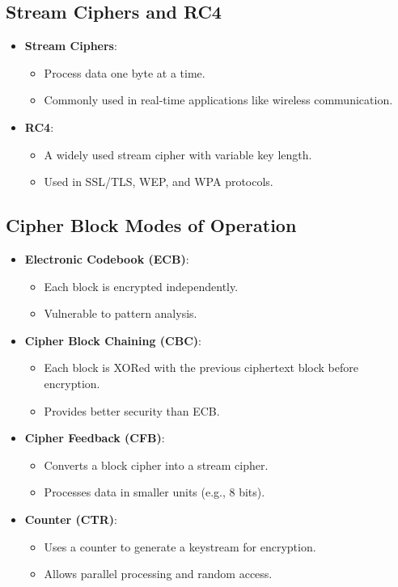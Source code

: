 \documentclass[12pt]{article}
\begin{document}
\subsection{Stream Ciphers and RC4}
\begin{itemize}
    \item \textbf{Stream Ciphers}:
    \begin{itemize}
        \item Process data one byte at a time.
        \item Commonly used in real-time applications like wireless communication.
    \end{itemize}
    \item \textbf{RC4}:
    \begin{itemize}
        \item A widely used stream cipher with variable key length.
        \item Used in SSL/TLS, WEP, and WPA protocols.
    \end{itemize}
\end{itemize}

\subsection{Cipher Block Modes of Operation}
\begin{itemize}
    \item \textbf{Electronic Codebook (ECB)}:
    \begin{itemize}
        \item Each block is encrypted independently.
        \item Vulnerable to pattern analysis.
    \end{itemize}
    \item \textbf{Cipher Block Chaining (CBC)}:
    \begin{itemize}
        \item Each block is XORed with the previous ciphertext block before encryption.
        \item Provides better security than ECB.
    \end{itemize}
    \item \textbf{Cipher Feedback (CFB)}:
    \begin{itemize}
        \item Converts a block cipher into a stream cipher.
        \item Processes data in smaller units (e.g., 8 bits).
    \end{itemize}
    \item \textbf{Counter (CTR)}:
    \begin{itemize}
        \item Uses a counter to generate a keystream for encryption.
        \item Allows parallel processing and random access.
    \end{itemize}
\end{itemize}
\end{document}
